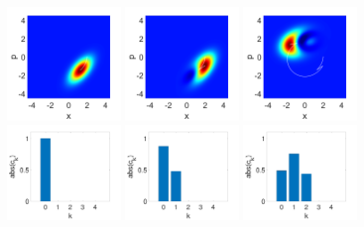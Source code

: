 \documentclass[12pt]{iopart} %
\begin{document}
\begin{figure}
\begin{centering}
	  \includegraphics[width=0.3\textwidth]{WigJump1Pos.pdf}
	  \includegraphics[width=0.3\textwidth]{WigJump2Pos.pdf}
	  \includegraphics[width=0.3\textwidth]{WigJump3Pos.pdf} \\
	  \includegraphics[width=0.3\textwidth]{HistogramPos1.pdf}
	  \includegraphics[width=0.3\textwidth]{HistogramPos2.pdf}
	  \includegraphics[width=0.3\textwidth]{HistogramPos3.pdf}

\end{centering}
\end{figure}
\end{document}
